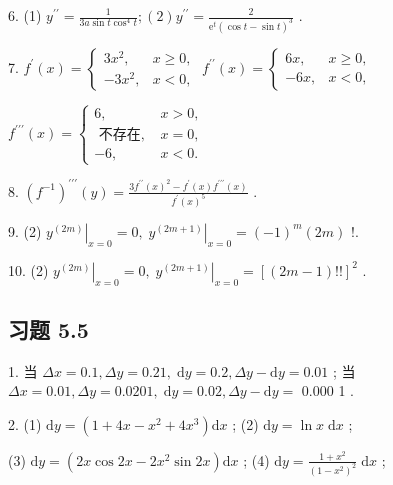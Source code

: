 6. (1) \({y}^{\prime \prime } = \frac{1}{{3a}\sin t{\cos }^{4}t};\left( 2\right) {y}^{\prime \prime } = \frac{2}{{\mathrm{e}}^{t}{\left( \cos t - \sin t\right) }^{3}}\) .

7. \({f}^{\prime }\left( x\right)  = \left\{  {\begin{matrix} 3{x}^{2}, & x \geq  0, \\   - 3{x}^{2}, & x < 0, \end{matrix}\;{f}^{\prime \prime }\left( x\right)  = \left\{  \begin{matrix} {6x}, & x \geq  0, \\   - {6x}, & x < 0, \end{matrix}\right. }\right.\)

\({f}^{\prime \prime \prime }\left( x\right)  = \left\{  \begin{matrix} 6, & x > 0, \\  \text{ 不存在, } & x = 0, \\   - 6, & x < 0. \end{matrix}\right.\)

8. \({\left( {f}^{-1}\right) }^{\prime \prime \prime }\left( y\right)  = \frac{3{f}^{\prime \prime }{\left( x\right) }^{2} - {f}^{\prime }\left( x\right) {f}^{\prime \prime \prime }\left( x\right) }{{f}^{\prime }{\left( x\right) }^{5}}\) .

9. (2) \({\left. {y}^{\left( 2m\right) }\right| }_{x = 0} = 0,{\left. \;{y}^{\left( 2m + 1\right) }\right| }_{x = 0} = {\left( -1\right) }^{m}\left( {2m}\right)\) !.

10. (2) \({\left. {y}^{\left( 2m\right) }\right| }_{x = 0} = 0,{\left. \;{y}^{\left( 2m + 1\right) }\right| }_{x = 0} = {\left\lbrack  \left( 2m - 1\right) !!\right\rbrack  }^{2}\) .

\subsection{习题 5.5}

1. 当 \({\Delta x} = {0.1},{\Delta y} = {0.21},\mathrm{\;d}y = {0.2},{\Delta y} - \mathrm{d}y = {0.01}\) ; 当 \({\Delta x} = {0.01},{\Delta y} = {0.0201},\mathrm{\;d}y = {0.02},{\Delta y} - \mathrm{d}y =\) 0.000 1 .

2. (1) \(\mathrm{d}y = \left( {1 + {4x} - {x}^{2} + 4{x}^{3}}\right) \mathrm{d}x\) ; (2) \(\mathrm{d}y = \ln x\mathrm{\;d}x\) ;

(3) \(\mathrm{d}y = \left( {{2x}\cos {2x} - 2{x}^{2}\sin {2x}}\right) \mathrm{d}x\) ; (4) \(\mathrm{d}y = \frac{1 + {x}^{2}}{{\left( 1 - {x}^{2}\right) }^{2}}\mathrm{\;d}x\) ;

